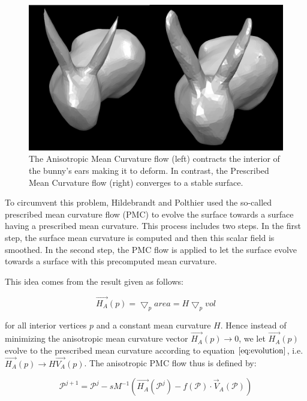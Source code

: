 \documentclass[11pt]{article}
\begin{document}
\begin{figure}[htb]
\centering
\includegraphics[width=\textwidth]{amc_pmc.png}
\caption{The Anisotropic Mean Curvature flow (left) contracts the interior of the bunny's ears making it to deform. In contrast, the Prescribed Mean Curvature flow (right) converges to a stable surface.}
\label{fig:amc_pmc}
\end{figure}

To circumvent this problem, Hildebrandt and Polthier \cite{Hildebrandt04anisotropicfiltering} used the so-called prescribed mean curvature flow (PMC) to evolve the surface towards a surface having a prescribed mean curvature. This process includes two steps. In the first step, the surface mean curvature is computed and then this scalar field is smoothed. In the second step, the PMC flow is applied to let the surface evolve towards a surface with this precomputed mean curvature. 

This idea comes from the result \cite{PolthierRossmann2002} given as follows:

\begin{equation}
\vec{H_A}(p) = \bigtriangledown_p area = H \bigtriangledown_p vol
\label{eq:evolution}
\end{equation}

for all interior vertices $p$ and a constant mean curvature $H$. Hence instead of minimizing the anisotropic mean curvature vector $\vec{H_A}(p) \rightarrow 0$, we let $\vec{H_A}(p)$ evolve to the prescribed mean curvature according to equation $\ref{eq:evolution}$, i.e. $\vec{H_A}(p) \rightarrow H\vec{V_A}(p)$. The anisotropic PMC flow thus is defined by:

\begin{equation}
\mathcal{P}^{j+1} = \mathcal{P}^j -sM^{-1}(\vec{H_A}(\mathcal{P}^j) - f(\mathcal{P}) \cdot \vec{V}_A(\mathcal{P}))
\label{eq:pmc}
\end{equation}
\end{document}
